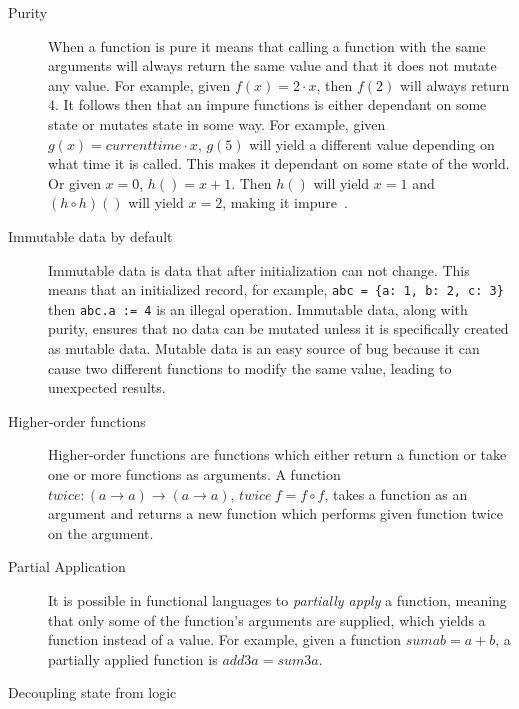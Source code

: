 \begin{description}
\item[ Purity ]

When a function is pure it means that calling a function with the same arguments
        will always return the same value and that it does not mutate any value.
        For example, given $f(x) = 2\cdot x$, then $f(2)$ will always
        return $4$. It follows then that an impure functions is either dependant
        on some state or mutates state in some way. For example, given $g(x) =
        currenttime \cdot x$, $g(5)$ will yield a different value depending on
        what time it is called. This makes it dependant on some state of the
        world. Or given $x=0$, $h()=x+1$. Then $h()$ will yield $x=1$ and $(h
        \circ h)()$ will yield $x=2$, making it impure~\cite{hughes1989functional}.

\item[ Immutable data by default ]

Immutable data is data that after initialization can not change. This means that
an initialized record, for example, \texttt{abc = \{a: 1, b: 2, c: 3\}} then
\texttt{abc.a := 4} is an illegal operation. Immutable data, along with purity,
ensures that no data can be mutated unless it is specifically created as mutable
data.  Mutable data is an easy source of bug because it can cause two different
functions to modify the same value, leading to unexpected results.

\item[Higher-order functions]

	Higher-order functions are functions which either return a function or take
one or more functions as arguments. A function $twice : (a\rightarrow
a)\rightarrow (a\rightarrow a)$, $twice\ f = f \circ f$, takes a function as an
argument and returns a new function which performs given function twice on the
argument. 

\item[Partial Application] 
    It is possible in functional languages to \textit{partially apply} a
    function, meaning that only some of the function's arguments are supplied,
    which yields a function instead of a value. For example, given a function
    $sum a b = a + b$, a partially applied function is $add3 a = sum 3 a$. 

\item[Decoupling state from logic]


\end{description}
